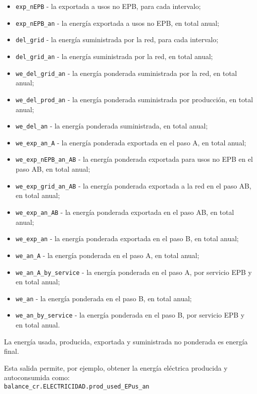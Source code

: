 \documentclass[10pt,notitlepage,oneside,a4paper]{article}
\begin{document}
\begin{itemize}
    \item \texttt{exp\_nEPB} - la exportada a usos no EPB, para cada intervalo;
    \item \texttt{exp\_nEPB\_an} - la energía exportada a usos no EPB, en total anual;
    \item \texttt{del\_grid} - la energía suministrada por la red, para cada intervalo;
    \item \texttt{del\_grid\_an} - la energía suministrada por la red, en total anual;
    \item \texttt{we\_del\_grid\_an} - la energía ponderada suministrada por la red, en total anual;
    \item \texttt{we\_del\_prod\_an} - la energía ponderada suministrada por producción, en total anual;
    \item \texttt{we\_del\_an} - la energía ponderada suministrada, en total anual;
    \item \texttt{we\_exp\_an\_A} - la energía ponderada exportada en el paso A, en total anual;
    \item \texttt{we\_exp\_nEPB\_an\_AB} - la energía ponderada exportada para usos no EPB en el paso AB, en total anual;
    \item \texttt{we\_exp\_grid\_an\_AB} - la energía ponderada exportada a la red en el paso AB, en total anual;
    \item \texttt{we\_exp\_an\_AB} - la energía ponderada exportada en el paso AB, en total anual;
    \item \texttt{we\_exp\_an} - la energía ponderada exportada en el paso B, en total anual;
    \item \texttt{we\_an\_A} - la energía ponderada en el paso A, en total anual;
    \item \texttt{we\_an\_A\_by\_service} - la energía ponderada en el paso A, por servicio EPB y en total anual;
    \item \texttt{we\_an} - la energía ponderada en el paso B, en total anual;
    \item \texttt{we\_an\_by\_service} - la energía ponderada en el paso B, por servicio EPB y en total anual.
\end{itemize}

\begin{myquote}\small
    La energía usada, producida, exportada y suministrada no ponderada es energía final.
\end{myquote}

\begin{myquote}\small

    Esta salida permite, por ejemplo, obtener la energía eléctrica producida y autoconsumida como:\\

    \texttt{balance\_cr.ELECTRICIDAD.prod\_used\_EPus\_an}
\end{myquote}
\end{document}
